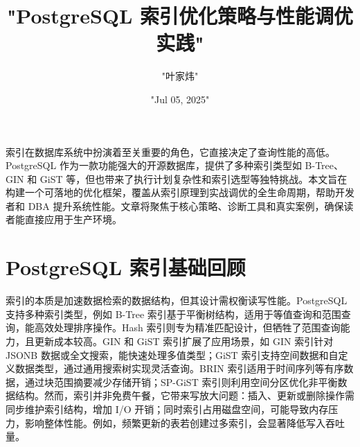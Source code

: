\title{"PostgreSQL 索引优化策略与性能调优实践"}
\author{"叶家炜"}
\date{"Jul 05, 2025"}
\maketitle
索引在数据库系统中扮演着至关重要的角色，它直接决定了查询性能的高低。PostgreSQL 作为一款功能强大的开源数据库，提供了多种索引类型如 B-Tree、GIN 和 GiST 等，但也带来了执行计划复杂性和索引选型等独特挑战。本文旨在构建一个可落地的优化框架，覆盖从索引原理到实战调优的全生命周期，帮助开发者和 DBA 提升系统性能。文章将聚焦于核心策略、诊断工具和真实案例，确保读者能直接应用于生产环境。\par
\chapter{PostgreSQL 索引基础回顾}
索引的本质是加速数据检索的数据结构，但其设计需权衡读写性能。PostgreSQL 支持多种索引类型，例如 B-Tree 索引基于平衡树结构，适用于等值查询和范围查询，能高效处理排序操作。Hash 索引则专为精准匹配设计，但牺牲了范围查询能力，且更新成本较高。GIN 和 GiST 索引扩展了应用场景，如 GIN 索引针对 JSONB 数据或全文搜索，能快速处理多值类型；GiST 索引支持空间数据和自定义数据类型，通过通用搜索树实现灵活查询。BRIN 索引适用于时间序列等有序数据，通过块范围摘要减少存储开销；SP-GiST 索引则利用空间分区优化非平衡数据结构。然而，索引并非免费午餐，它带来写放大问题：插入、更新或删除操作需同步维护索引结构，增加 I/O 开销；同时索引占用磁盘空间，可能导致内存压力，影响整体性能。例如，频繁更新的表若创建过多索引，会显著降低写入吞吐量。\par
